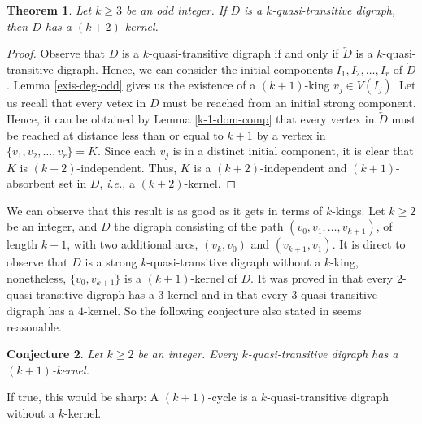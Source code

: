 \documentclass[preprint]{elsarticle}
\newtheorem{thm}{Theorem}[section]
\newtheorem{conjecture}[thm]{Conjecture}
\begin{document}
\begin{thm}
Let $k \ge 3$ be an odd integer.   If $D$ is a $k$-quasi-transitive digraph, then $D$ has a $(k+2)$-kernel.
\end{thm}

\begin{proof}
Observe that $D$ is a $k$-quasi-transitive digraph if and only if $\overleftarrow{D}$ is a $k$-quasi-transitive digraph.   Hence, we can consider the initial components $I_1, I_2, \dots, I_r$ of $\overleftarrow{D}$.    Lemma \ref{exis-deg-odd} gives us the existence of a $(k+1)$-king $v_j \in V(I_j)$.   Let us recall that every vetex in $D$ must be reached from an initial strong component.   Hence, it can be obtained by Lemma \ref{k-1-dom-comp} that every vertex in $\overleftarrow{D}$ must be reached at distance less than or equal to $k+1$ by a vertex in $\{ v_1, v_2, \dots, v_r \} = K$.   Since each $v_j$ is in a distinct initial component, it is clear that $K$ is $(k+2)$-independent.   Thus, $K$ is a $(k+2)$-independent and $(k+1)$-absorbent set in $D$, \emph{i.e.}, a $(k+2)$-kernel.
\end{proof}

We can observe that this result is as good as it gets in terms of $k$-kings.   Let $k \ge 2$ be an integer, and $D$ the digraph consisting of the path $(v_0, v_1, \dots, v_{k+1})$, of length $k+1$,  with two additional arcs, $(v_k, v_0)$ and $(v_{k+1}, v_1)$.   It is direct to observe that $D$ is a strong $k$-quasi-transitive digraph without a $k$-king, nonetheless, $\{ v_0, v_{k+1} \}$ is a $(k+1)$-kernel of $D$.   It was proved in \cite{GS-HC2} that every $2$-quasi-transitive digraph has a $3$-kernel and in \cite{GS-HC} that every $3$-quasi-transitive digraph has a $4$-kernel.   So the following conjecture also stated in \cite{GS-HC} seems reasonable.

\begin{conjecture}
Let $k \ge 2$ be an integer.   Every $k$-quasi-transitive digraph has a $(k+1)$-kernel.
\end{conjecture}

If true, this would be sharp:   A $(k+1)$-cycle is a $k$-quasi-transitive digraph without a $k$-kernel.














\end{document}
